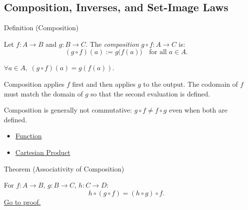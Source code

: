 
\subsection{Composition, Inverses, and Set-Image Laws}


\begin{definitionbox}{Definition (Composition)}
\begin{definition}[Composition]\label{def:composition}
Let $f : A \to B$ and $g : B \to C$. The \emph{composition} $g \circ f : A \to C$ is:
\[
(g \circ f)(a) := g\bigl(f(a)\bigr)
\quad\text{for all } a \in A.
\]
\end{definition}
\end{definitionbox}

\begin{remark*}
$\forall a\in A,\; (g\circ f)(a)=g(f(a))$.
\end{remark*}

\begin{remark*}[Interpretation]
Composition applies $f$ first and then applies $g$ to the output. The codomain
of $f$ must match the domain of $g$ so that the second evaluation is defined.
\end{remark*}

\begin{remark*}[Exposition]
Composition is generally not commutative: $g \circ f \neq f \circ g$ even
when both are defined.
\end{remark*}

\begin{dependencies}
\begin{itemize}
  \item \hyperref[def:function]{Function}
  \item \hyperref[def:cartesian-product-rel]{Cartesian Product}
\end{itemize}
\end{dependencies}

\begin{theorembox}{Theorem (Associativity of Composition)}
\begin{theorem}\label{thm:comp-assoc}
For $f : A \to B$, $g : B \to C$, $h : C \to D$:
\[
h \circ (g \circ f) = (h \circ g) \circ f.
\]
\hyperref[prf:comp-assoc]{Go to proof.}
\end{theorem}
\end{theorembox}

